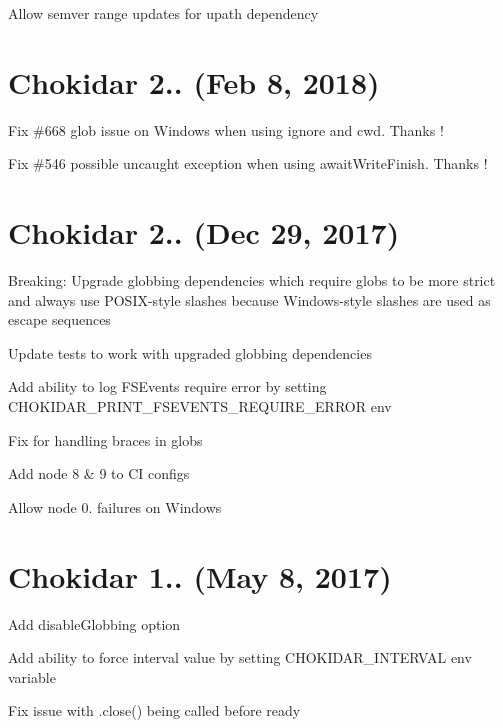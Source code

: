 
\begin{DoxyItemize}
\item Allow semver range updates for upath dependency
\end{DoxyItemize}

\section*{Chokidar 2.. (Feb 8, 2018)}


\begin{DoxyItemize}
\item Fix \#668 glob issue on Windows when using {\ttfamily ignore} and {\ttfamily cwd}. Thanks !
\item Fix \#546 possible uncaught exception when using {\ttfamily await\+Write\+Finish}. Thanks !
\end{DoxyItemize}

\section*{Chokidar 2.. (Dec 29, 2017)}


\begin{DoxyItemize}
\item Breaking\+: Upgrade globbing dependencies which require globs to be more strict and always use P\+O\+S\+I\+X-\/style slashes because Windows-\/style slashes are used as escape sequences
\item Update tests to work with upgraded globbing dependencies
\item Add ability to log F\+S\+Events require error by setting {\ttfamily C\+H\+O\+K\+I\+D\+A\+R\+\_\+\+P\+R\+I\+N\+T\+\_\+\+F\+S\+E\+V\+E\+N\+T\+S\+\_\+\+R\+E\+Q\+U\+I\+R\+E\+\_\+\+E\+R\+R\+OR} env
\item Fix for handling braces in globs
\item Add node 8 \& 9 to CI configs
\item Allow node 0. failures on Windows
\end{DoxyItemize}

\section*{Chokidar 1.. (May 8, 2017)}


\begin{DoxyItemize}
\item Add {\ttfamily disable\+Globbing} option
\item Add ability to force interval value by setting C\+H\+O\+K\+I\+D\+A\+R\+\_\+\+I\+N\+T\+E\+R\+V\+AL env variable
\item Fix issue with {\ttfamily .close()} being called before {\ttfamily ready}
\end{DoxyItemize}

